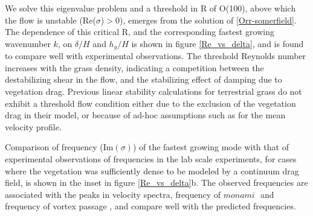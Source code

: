 \documentclass[aps,prl,twocolumn,superscriptaddress,10pt]{revtex4-1}  %
\newcommand{\hg}{h_g}
\newcommand{\Rey}{\text{R}}
\newcommand{\monami}{\textit{monami }}
\begin{document}

We solve this eigenvalue problem and a threshold in $\Rey$ of O(100), above which the flow is unstable (Re($\sigma$)$>$0), emerges from the 
solution of \eqref{Orr-somerfield}. The dependence of this critical $\Rey$, and the corresponding fastest growing wavenumber $k$, on $\delta/H$ and $\hg/H$ is shown 
in figure \ref{Re_vs_delta}, and is found to compare well with experimental observations\cite{Ghisal02}.
The threshold Reynolds number increases with the grass density, indicating a competition between the 
destabilizing shear in the flow, and the stabilizing effect of damping due to vegetation drag.
Previous linear stability calculations for terrestrial grass do not exhibit a threshold flow condition 
either due to the exclusion of the vegetation drag in their model\cite{Raupach96}, or because of ad-hoc
assumptions such as for the mean velocity profile\cite{Raupach96,Delangre06}.

Comparison of frequency (Im$(\sigma)$) of the fastest growing mode with that of experimental observations of frequencies in
the lab scale experiments, for cases where the vegetation was sufficiently dense to be modeled by a continuum drag field, is shown in the inset in figure \ref{Re_vs_delta}b. 
The observed frequencies are associated with the peaks in velocity spectra, frequency of $\monami$ and frequency of 
vortex passage \cite{Ghisal02}, and compare well with the predicted frequencies. 
\end{document}
